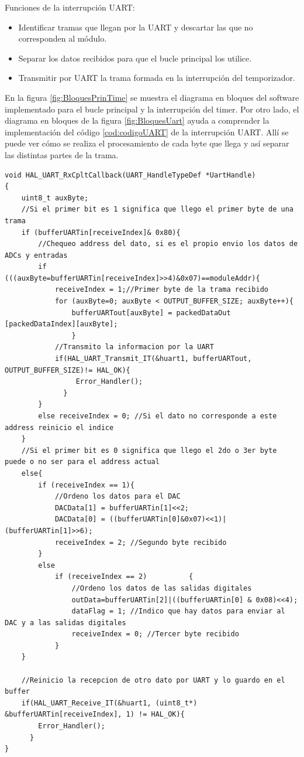 Funciones de la interrupción UART:
\begin{itemize}
	\item Identificar tramas que llegan por la UART y descartar las que no corresponden al módulo.
	\item Separar los datos recibidos para que el bucle principal los utilice.
	\item Transmitir por UART la trama formada en la interrupción del temporizador.
\end{itemize}

En la figura \ref{fig:BloquesPrinTime} se muestra el diagrama en bloques del software implementado para el bucle principal y la interrupción del timer. Por otro lado, el diagrama en bloques de la figura \ref{fig:BloquesUart} ayuda a comprender la implementación del código \ref{cod:codigoUART} de la interrupción UART. Allí se puede ver cómo se realiza el procesamiento de cada byte que llega y así separar las distintas partes de la trama.


\begin{lstlisting}[label=cod:codigoUART, caption= Código del callback de interrupción de recepción por UART.]
void HAL_UART_RxCpltCallback(UART_HandleTypeDef *UartHandle)
{
	uint8_t auxByte;
	//Si el primer bit es 1 significa que llego el primer byte de una trama
	if (bufferUARTin[receiveIndex]& 0x80){
		//Chequeo address del dato, si es el propio envio los datos de ADCs y entradas
		if (((auxByte=bufferUARTin[receiveIndex]>>4)&0x07)==moduleAddr){
			receiveIndex = 1;//Primer byte de la trama recibido
			for (auxByte=0; auxByte < OUTPUT_BUFFER_SIZE; auxByte++){
				bufferUARTout[auxByte] = packedDataOut [packedDataIndex][auxByte];
				}
			//Transmito la informacion por la UART
			if(HAL_UART_Transmit_IT(&huart1, bufferUARTout, OUTPUT_BUFFER_SIZE)!= HAL_OK){
				 Error_Handler();
			  }
		}
		else receiveIndex = 0; //Si el dato no corresponde a este address reinicio el indice
	}
	//Si el primer bit es 0 significa que llego el 2do o 3er byte puede o no ser para el address actual
	else{
		if (receiveIndex == 1){
			//Ordeno los datos para el DAC
			DACData[1] = bufferUARTin[1]<<2; 
			DACData[0] = ((bufferUARTin[0]&0x07)<<1)|(bufferUARTin[1]>>6); 
			receiveIndex = 2; //Segundo byte recibido
		}
		else
			if (receiveIndex == 2)			{
				//Ordeno los datos de las salidas digitales
				outData=bufferUARTin[2]|((bufferUARTin[0] & 0x08)<<4);
				dataFlag = 1; //Indico que hay datos para enviar al DAC y a las salidas digitales
				receiveIndex = 0; //Tercer byte recibido
			}
	}

	//Reinicio la recepcion de otro dato por UART y lo guardo en el buffer
	if(HAL_UART_Receive_IT(&huart1, (uint8_t*) &bufferUARTin[receiveIndex], 1) != HAL_OK){
	    Error_Handler();
	  }
}


\end{lstlisting}

